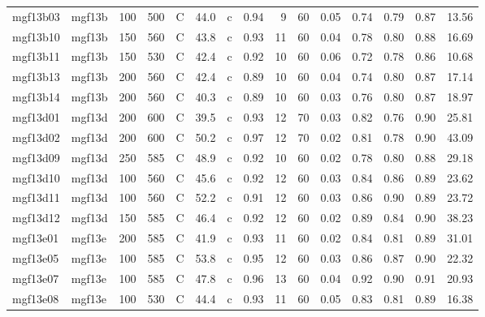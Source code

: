 \documentclass{article}
\begin{document}
\begin{landscape}
\begin{longtable}{llrrlrlrrrrrrrr}
    mgf13b03 &     mgf13b &  100 &  500 &     C &    44.0 &   c &  0.94 &   9 &         60 &  0.05 &  0.74 &  0.79 &  0.87 &   13.56 \\
    mgf13b10 &     mgf13b &  150 &  560 &     C &    43.8 &   c &  0.93 &  11 &         60 &  0.04 &  0.78 &  0.80 &  0.88 &   16.69 \\
    mgf13b11 &     mgf13b &  150 &  530 &     C &    42.4 &   c &  0.92 &  10 &         60 &  0.06 &  0.72 &  0.78 &  0.86 &   10.68 \\
    mgf13b13 &     mgf13b &  200 &  560 &     C &    42.4 &   c &  0.89 &  10 &         60 &  0.04 &  0.74 &  0.80 &  0.87 &   17.14 \\
    mgf13b14 &     mgf13b &  200 &  560 &     C &    40.3 &   c &  0.89 &  10 &         60 &  0.03 &  0.76 &  0.80 &  0.87 &   18.97 \\
    mgf13d01 &     mgf13d &  200 &  600 &     C &    39.5 &   c &  0.93 &  12 &         70 &  0.03 &  0.82 &  0.76 &  0.90 &   25.81 \\
    mgf13d02 &     mgf13d &  200 &  600 &     C &    50.2 &   c &  0.97 &  12 &         70 &  0.02 &  0.81 &  0.78 &  0.90 &   43.09 \\
    mgf13d09 &     mgf13d &  250 &  585 &     C &    48.9 &   c &  0.92 &  10 &         60 &  0.02 &  0.78 &  0.80 &  0.88 &   29.18 \\
    mgf13d10 &     mgf13d &  100 &  560 &     C &    45.6 &   c &  0.92 &  12 &         60 &  0.03 &  0.84 &  0.86 &  0.89 &   23.62 \\
    mgf13d11 &     mgf13d &  100 &  560 &     C &    52.2 &   c &  0.91 &  12 &         60 &  0.03 &  0.86 &  0.90 &  0.89 &   23.72 \\
    mgf13d12 &     mgf13d &  150 &  585 &     C &    46.4 &   c &  0.92 &  12 &         60 &  0.02 &  0.89 &  0.84 &  0.90 &   38.23 \\
    mgf13e01 &     mgf13e &  200 &  585 &     C &    41.9 &   c &  0.93 &  11 &         60 &  0.02 &  0.84 &  0.81 &  0.89 &   31.01 \\
    mgf13e05 &     mgf13e &  100 &  585 &     C &    53.8 &   c &  0.95 &  12 &         60 &  0.03 &  0.86 &  0.87 &  0.90 &   22.32 \\
    mgf13e07 &     mgf13e &  100 &  585 &     C &    47.8 &   c &  0.96 &  13 &         60 &  0.04 &  0.92 &  0.90 &  0.91 &   20.93 \\
    mgf13e08 &     mgf13e &  100 &  530 &     C &    44.4 &   c &  0.93 &  11 &         60 &  0.05 &  0.83 &  0.81 &  0.89 &   16.38 \\

\end{longtable}
\end{landscape}
\end{document}
